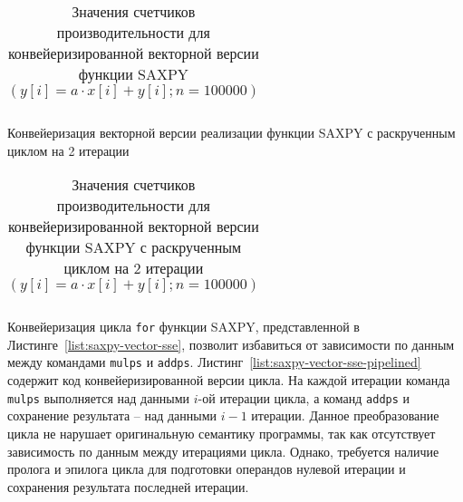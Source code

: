 \begin{table} [!h]
  \centering
  \captionsetup{width=15cm}
  \caption{Значения счетчиков производительности для конвейеризированной векторной 
версии функции SAXPY $(y[i] = a \cdot x[i] + y[i]; n = 100000)$}\label{table:perf-saxpy-vector-sse-pipelined}%
\begin{tabular}{  | p{0.09\linewidth} | p{0.09\linewidth} | p{0.09\linewidth} |
p{0.13\linewidth} | p{0.09\linewidth} | p{0.09\linewidth} | p{0.09\linewidth} |
p{0.09\linewidth}l | }
\hline
\hline

\hline
\hline
  \end{tabular}
\end{table}

\begin{ListingEnv}[!ht]
	
    \caption{Конвейеризация векторной версии реализации функции SAXPY с раскрученным циклом на 2 итерации}
    \label{list:saxpy-vector-sse-pipelined-unrolled}
\end{ListingEnv}

\begin{table} [!h]
  \centering
  \captionsetup{width=15cm}
  \caption{Значения счетчиков производительности для конвейеризированной векторной 
версии функции SAXPY с раскрученным циклом на 2 итерации 
$(y[i] = a \cdot x[i] + y[i]; n = 100000)$}\label{table:perf-saxpy-vector-sse-pipelined-unrolled}%
\begin{tabular}{  | p{0.09\linewidth} | p{0.09\linewidth} | p{0.09\linewidth} |
p{0.13\linewidth} | p{0.09\linewidth} | p{0.09\linewidth} | p{0.09\linewidth} |
p{0.09\linewidth}l | }
\hline
\hline

\hline
\hline
  \end{tabular}
\end{table}

Конвейеризация цикла \texttt{for} функции SAXPY, представленной в Листинге~\ref{list:saxpy-vector-sse}, позволит избавиться от зависимости по данным между командами \texttt{mulps} и \texttt{addps}. Листинг~\ref{list:saxpy-vector-sse-pipelined} содержит код конвейеризированной версии цикла. На каждой итерации команда \texttt{mulps} выполняется над данными $i$-ой итерации цикла, а команд \texttt{addps} и сохранение результата -- над данными $i-1$ итерации. Данное преобразование цикла не нарушает оригинальную семантику программы, так как отсутствует зависимость по данным между итерациями цикла. Однако, требуется наличие пролога и эпилога цикла для подготовки операндов нулевой итерации и сохранения результата последней итерации.

